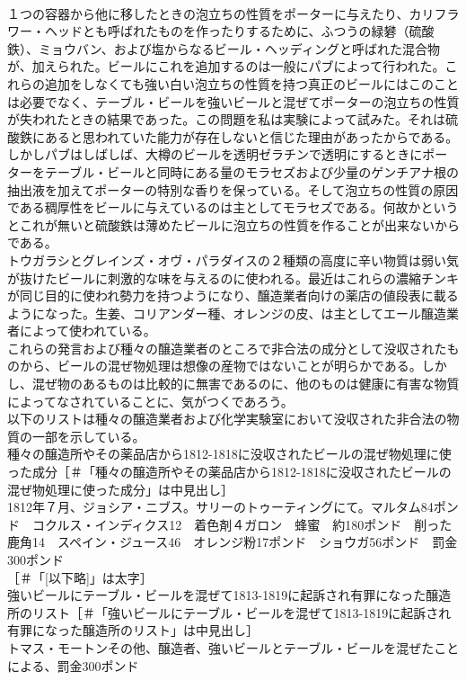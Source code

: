 \documentclass[8pt]{extreport}
\begin{document}
\begin{CJK}{UTF8}{min}
\\	１つの容器から他に移したときの泡立ちの性質をポーターに与えたり、カリフラワー・ヘッドとも呼ばれたものを作ったりするために、ふつうの緑礬（硫酸鉄）、ミョウバン、および塩からなるビール・ヘッディングと呼ばれた混合物が、加えられた。ビールにこれを追加するのは一般にパブによって行われた。これらの追加をしなくても強い白い泡立ちの性質を持つ真正のビールにはこのことは必要でなく、テーブル・ビールを強いビールと混ぜてポーターの泡立ちの性質が失われたときの結果であった。この問題を私は実験によって試みた。それは硫酸鉄にあると思われていた能力が存在しないと信じた理由があったからである。しかしパブはしばしば、大樽のビールを透明ゼラチンで透明にするときにポーターをテーブル・ビールと同時にある量のモラセズおよび少量のゲンチアナ根の抽出液を加えてポーターの特別な香りを保っている。そして泡立ちの性質の原因である稠厚性をビールに与えているのは主としてモラセズである。何故かというとこれが無いと硫酸鉄は薄めたビールに泡立ちの性質を作ることが出来ないからである。
\\	トウガラシとグレインズ・オヴ・パラダイスの２種類の高度に辛い物質は弱い気が抜けたビールに刺激的な味を与えるのに使われる。最近はこれらの濃縮チンキが同じ目的に使われ勢力を持つようになり、醸造業者向けの薬店の値段表に載るようになった。生姜、コリアンダー種、オレンジの皮、は主としてエール醸造業者によって使われている。
\\	これらの発言および種々の醸造業者のところで非合法の成分として没収されたものから、ビールの混ぜ物処理は想像の産物ではないことが明らかである。しかし、混ぜ物のあるものは比較的に無害であるのに、他のものは健康に有害な物質によってなされていることに、気がつくであろう。
\\	以下のリストは種々の醸造業者および化学実験室において没収された非合法の物質の一部を示している。
\\	種々の醸造所やその薬品店から1812-1818に没収されたビールの混ぜ物処理に使った成分［＃「種々の醸造所やその薬品店から1812-1818に没収されたビールの混ぜ物処理に使った成分」は中見出し］
\\	1812年７月、ジョシア・ニブス。サリーのトゥーティングにて。マルタム84ポンド　コクルス・インディクス12　着色剤４ガロン　蜂蜜　約180ポンド　削った鹿角14　スペイン・ジュース46　オレンジ粉17ポンド　ショウガ56ポンド　罰金300ポンド
\\	[以下略]［＃「[以下略]」は太字］
\\	強いビールにテーブル・ビールを混ぜて1813-1819に起訴され有罪になった醸造所のリスト［＃「強いビールにテーブル・ビールを混ぜて1813-1819に起訴され有罪になった醸造所のリスト」は中見出し］
\\	トマス・モートンその他、醸造者、強いビールとテーブル・ビールを混ぜたことによる、罰金300ポンド

\end{CJK}
\end{document}
